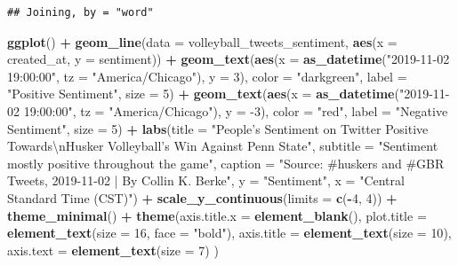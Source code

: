 \documentclass[]{book}
\newenvironment{Shaded}{\begin{snugshade}}{\end{snugshade}}
\newcommand{\CharTok}[1]{\textcolor[rgb]{0.31,0.60,0.02}{#1}}
\newcommand{\DataTypeTok}[1]{\textcolor[rgb]{0.13,0.29,0.53}{#1}}
\newcommand{\DecValTok}[1]{\textcolor[rgb]{0.00,0.00,0.81}{#1}}
\newcommand{\KeywordTok}[1]{\textcolor[rgb]{0.13,0.29,0.53}{\textbf{#1}}}
\newcommand{\NormalTok}[1]{#1}
\newcommand{\OperatorTok}[1]{\textcolor[rgb]{0.81,0.36,0.00}{\textbf{#1}}}
\newcommand{\StringTok}[1]{\textcolor[rgb]{0.31,0.60,0.02}{#1}}
\begin{document}
\begin{verbatim}
## Joining, by = "word"
\end{verbatim}

\begin{Shaded}
\begin{Highlighting}[]
\KeywordTok{ggplot}\NormalTok{() }\OperatorTok{+}
\StringTok{  }\KeywordTok{geom_line}\NormalTok{(}\DataTypeTok{data =}\NormalTok{ volleyball_tweets_sentiment, }\KeywordTok{aes}\NormalTok{(}\DataTypeTok{x =}\NormalTok{ created_at, }\DataTypeTok{y =}\NormalTok{ sentiment)) }\OperatorTok{+}
\StringTok{  }\KeywordTok{geom_text}\NormalTok{(}\KeywordTok{aes}\NormalTok{(}\DataTypeTok{x =} \KeywordTok{as_datetime}\NormalTok{(}\StringTok{"2019-11-02 19:00:00"}\NormalTok{, }\DataTypeTok{tz =} \StringTok{"America/Chicago"}\NormalTok{), }\DataTypeTok{y =} \DecValTok{3}\NormalTok{), }\DataTypeTok{color =} \StringTok{"darkgreen"}\NormalTok{, }\DataTypeTok{label =} \StringTok{"Positive Sentiment"}\NormalTok{, }\DataTypeTok{size =} \DecValTok{5}\NormalTok{) }\OperatorTok{+}
\StringTok{  }\KeywordTok{geom_text}\NormalTok{(}\KeywordTok{aes}\NormalTok{(}\DataTypeTok{x =} \KeywordTok{as_datetime}\NormalTok{(}\StringTok{"2019-11-02 19:00:00"}\NormalTok{, }\DataTypeTok{tz =} \StringTok{"America/Chicago"}\NormalTok{), }\DataTypeTok{y =} \DecValTok{-3}\NormalTok{), }\DataTypeTok{color =} \StringTok{"red"}\NormalTok{, }\DataTypeTok{label =} \StringTok{"Negative Sentiment"}\NormalTok{, }\DataTypeTok{size =} \DecValTok{5}\NormalTok{) }\OperatorTok{+}
\StringTok{  }\KeywordTok{labs}\NormalTok{(}\DataTypeTok{title =} \StringTok{"People's Sentiment on Twitter Positive Towards}\CharTok{\textbackslash{}n}\StringTok{Husker Volleyball's Win Against Penn State"}\NormalTok{,}
       \DataTypeTok{subtitle =} \StringTok{"Sentiment mostly positive throughout the game"}\NormalTok{,}
       \DataTypeTok{caption =} \StringTok{"Source: #huskers and #GBR Tweets, 2019-11-02 | By Collin K. Berke"}\NormalTok{,}
       \DataTypeTok{y =} \StringTok{"Sentiment"}\NormalTok{,}
       \DataTypeTok{x =} \StringTok{"Central Standard Time (CST)"}\NormalTok{) }\OperatorTok{+}\StringTok{ }
\StringTok{  }\KeywordTok{scale_y_continuous}\NormalTok{(}\DataTypeTok{limits =} \KeywordTok{c}\NormalTok{(}\OperatorTok{-}\DecValTok{4}\NormalTok{, }\DecValTok{4}\NormalTok{)) }\OperatorTok{+}
\StringTok{  }\KeywordTok{theme_minimal}\NormalTok{() }\OperatorTok{+}
\StringTok{  }\KeywordTok{theme}\NormalTok{(}\DataTypeTok{axis.title.x =} \KeywordTok{element_blank}\NormalTok{(),}
        \DataTypeTok{plot.title =} \KeywordTok{element_text}\NormalTok{(}\DataTypeTok{size =} \DecValTok{16}\NormalTok{, }\DataTypeTok{face =} \StringTok{"bold"}\NormalTok{),}
    \DataTypeTok{axis.title =} \KeywordTok{element_text}\NormalTok{(}\DataTypeTok{size =} \DecValTok{10}\NormalTok{),}
    \DataTypeTok{axis.text =} \KeywordTok{element_text}\NormalTok{(}\DataTypeTok{size =} \DecValTok{7}\NormalTok{)}
\NormalTok{        )}
\end{Highlighting}
\end{Shaded}
\end{document}
